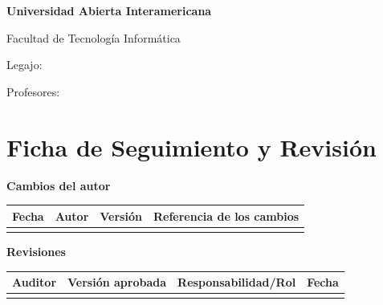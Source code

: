 \begin{titlepage}
  \centering
  {\logoportada\par}
  \vspace{0.8cm}
  {\large\bfseries Universidad Abierta Interamericana\par}
  {\large Facultad de Tecnología Informática\par}
  \vspace{0.3cm}
  {\logofacultad\par}
  \vspace{1.5cm}
  {\LARGE\bfseries \nombreproyecto\par}
  \vspace{0.5cm}
  {\large \titulodoc\par}
  {\large \tipodoc\par}
  \vspace{2.5cm}
  {\large \autor\par}
  {Legajo: \legajo\par}
  \ifx\sede\empty{}\fi
  \vspace{1cm}
  {Profesores: \profesores\par}
  \vfill
  {\fechadoc\par}
\end{titlepage}

\newcommand{\filascambios}{ & & & \\ \hline}
\newcommand{\filasrevisiones}{ & & & \\ \hline}
\newcommand{\fechacreacion}{}
\section*{Ficha de Seguimiento y Revisión}

\medskip\noindent\textbf{Cambios del autor}\par\smallskip
\begin{tabularx}{\textwidth}{|l|X|l|X|}
\hline
\textbf{Fecha} & \textbf{Autor} & \textbf{Versión} & \textbf{Referencia de los cambios}\\ \hline
\filascambios
\end{tabularx}

\medskip\noindent\textbf{Revisiones}\par\smallskip
\begin{tabularx}{\textwidth}{|X|l|X|l|}
\hline
\textbf{Auditor} & \textbf{Versión aprobada} & \textbf{Responsabilidad/Rol} & \textbf{Fecha}\\ \hline
\filasrevisiones
\end{tabularx}

